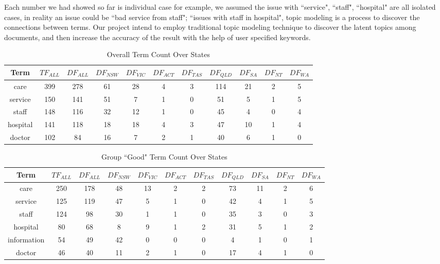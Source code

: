 \documentclass[11pt,twoside]{report}
\begin{document}
Each number we had showed so far is individual case for example, we assumed the issue with ``service", ``staff", ``hospital" are all isolated cases, in reality an issue could be ``bad service from staff"; ``issues with staff in hospital", topic modeling is a process to discover the connections between terms. Our project intend to employ traditional topic modeling technique to discover the latent topics among documents, and then increase the accuracy of the result with the help of user specified keywords.


\begin{table}[h]
\caption{Overall Term Count Over States}
\centering
\begin{tabular}{| c | c | c | c | c | c | c | c |c | c | c |}
\hline\hline
Term & $TF_{ALL}$ & $DF_{ALL}$ & $DF_{NSW}$ & $DF_{VIC}$ & $DF_{ACT}$ & $DF_{TAS}$ & $DF_{QLD}$ & $DF_{SA}$ & $DF_{NT}$ & $DF_{WA}$ \\
\hline
care & 399 & 278 & 61 & 28 & 4 & 3 & 114 & 21 & 2 & 5 \\
\hline
service & 150 & 141 & 51 & 7 & 1 & 0 & 51 & 5 & 1 & 5 \\
\hline
staff & 148 & 116 & 32 & 12 & 1 & 0 & 45 & 4 & 0 & 4 \\
\hline
hospital & 141 & 118 & 18 & 18 & 4 & 3 & 47 & 10 & 1 & 4 \\
\hline
doctor & 102 & 84 & 16 & 7 & 2 & 1 & 40 & 6 & 1 & 0 \\
\hline
\end{tabular}
\label{table:OverAllCount}
\end{table}

\begin{table}[h]
\caption{Group ``Good" Term Count Over States}
\centering
\begin{tabular}{| c | c | c | c | c | c | c | c |c | c | c |}
\hline\hline
Term & $TF_{ALL}$ & $DF_{ALL}$ & $DF_{NSW}$ & $DF_{VIC}$ & $DF_{ACT}$ & $DF_{TAS}$ & $DF_{QLD}$ & $DF_{SA}$ & $DF_{NT}$ & $DF_{WA}$ \\
\hline
care & 250 & 178 & 48 & 13 & 2 & 2 & 73 & 11 & 2 & 6 \\
\hline
service & 125 & 119 & 47 & 5 & 1 & 0 & 42 & 4 & 1 & 5 \\
\hline
staff & 124 & 98 & 30 & 1 & 1 & 0 & 35 & 3 & 0 & 3 \\
\hline
hospital & 80 & 68 & 8 & 9 & 1 & 2 & 31 & 5 & 1 & 2 \\
\hline
information & 54 & 49 & 42 & 0 & 0 & 0 & 4 & 1 & 0 & 1 \\
\hline
doctor & 46 & 40 & 11 & 2 & 1 & 0 & 17 & 4 & 1 & 0 \\
\hline
\end{tabular}
\label{table:GoodCount}
\end{table}
\end{document}
